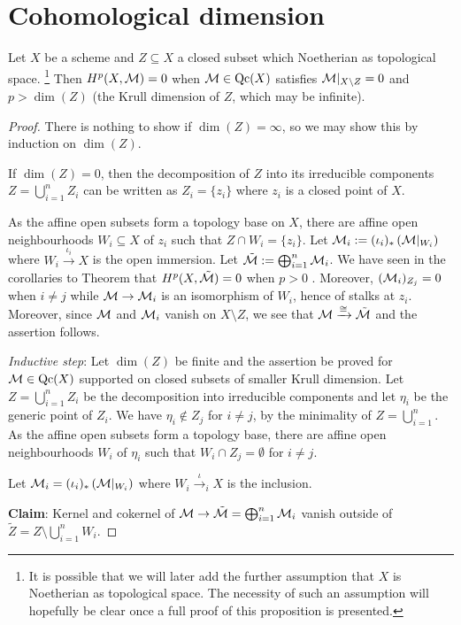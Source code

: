 \documentclass[a4paper,parskip=half,numbers=enddot, DIV=12]{scrreprt}
\begin{document}
\section{Cohomological dimension}
\begin{prop}[Grothendieck]
Let $X$ be a scheme and $Z\subseteq X$ a closed subset which Noetherian as topological space.%
\footnote{It is possible that we will later add the further assumption that $X$ is Noetherian as topological space. The necessity
of such an assumption will hopefully be clear once a full proof of this proposition is presented.}
Then $H^p(X,\mathcal{M})=0$ when $\mathcal{M}\in \mathrm{Qc}(X)$ satisfies
$\mathcal{M}\vert_{X\setminus Z}=0$ and $p>\dim(Z)$ (the Krull dimension of $Z$, which may be infinite).
\end{prop}
\begin{proof}
There is nothing to show if $\dim(Z)=\infty$, so we may show this by induction on $\dim(Z)$.

If $\dim(Z)=0$, then the decomposition of $Z$ into its irreducible components $Z=\bigcup_{i=1}^n Z_i$ can be written as $Z_i = \{z_i\}$
where $z_i$ is a closed point of $X$.

As the affine open subsets form a topology base on $X$, there are affine open neighbourhoods $W_i\subseteq X$ of $z_i$
such that $Z\cap W_i = \{z_i\}$. Let $\mathcal{M}_i := (\iota_i)_\ast\left(\mathcal{M}\vert_{W_i}\right)$ where 
$W_i\xrightarrow{\iota_i} X$ is the open immersion.
Let $\tilde {\mathcal{M}} := \bigoplus_{i=1}^n \mathcal{M}_i$. We have seen in the corollaries to Theorem  that
$H^p(X,\tilde{\mathcal{M}})=0$ when $p>0$%
.
Moreover, $(\mathcal{M}_i)_{Z_j}=0$ when $i\neq j$ while $\mathcal{M}\rightarrow \mathcal{M}_i$ is an isomorphism of $W_i$, hence of stalks at $z_i$.
Moreover, since $\mathcal{M}$ and $\mathcal{M}_i$ vanish on $X\setminus Z$,
we see that $\mathcal{M}\xrightarrow\cong\tilde{\mathcal{M}}$ and the assertion follows.

\emph{Inductive step}: Let $\dim(Z)$ be finite and the assertion be proved for $\mathcal{M} \in\mathrm{Qc}(X)$ supported on closed
subsets of smaller Krull dimension. Let $Z=\bigcup_{i=1}^n Z_i$ be the decomposition into irreducible components
and let $\eta_i$ be the generic point of $Z_i$. We have $\eta_i\notin Z_j$ for $i\neq j$, by the minimality
of $Z=\bigcup_{i=1}^n$. As the affine open subsets form a topology base, there are affine open neighbourhoods
$W_i$ of $\eta_i$ such that $W_i\cap Z_j=\emptyset$ for $i\neq j$.

Let $\mathcal{M}_i = (\iota_i)_\ast\left(\mathcal{M}\vert_{W_i}\right)$ where $W_i\xrightarrow\iota_iX$ is the inclusion.

\textbf{Claim}: Kernel and cokernel of $\mathcal{M}\rightarrow\tilde {\mathcal{M}} =\bigoplus_{i=1}^n \mathcal{M}_i$ vanish outside of
$\tilde Z = Z\setminus \bigcup_{i=1}^n W_i$.\def\qedsymbol{\emph{to be continued\ldots}}
\end{proof}
\appendix
\end{document}
